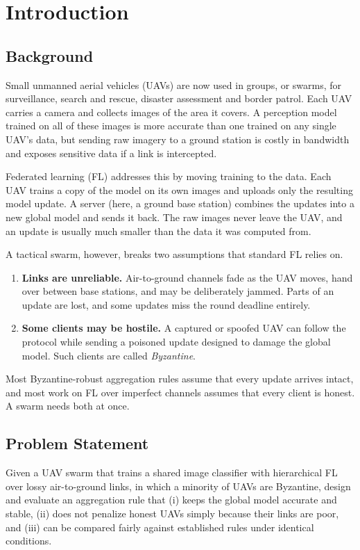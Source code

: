 \chapter{Introduction}
\thispagestyle{empty} %
\label{ch:intro}

\section{Background}
Small unmanned aerial vehicles (UAVs) are now used in groups, or swarms, for
surveillance, search and rescue, disaster assessment and border patrol. Each UAV
carries a camera and collects images of the area it covers. A perception model
trained on all of these images is more accurate than one trained on any single
UAV's data, but sending raw imagery to a ground station is costly in bandwidth and
exposes sensitive data if a link is intercepted.

Federated learning (FL) addresses this by moving training to the data. Each UAV
trains a copy of the model on its own images and uploads only the resulting model
update. A server (here, a ground base station) combines the updates into a new
global model and sends it back. The raw images never leave the UAV, and an update is
usually much smaller than the data it was computed from.

A tactical swarm, however, breaks two assumptions that standard FL relies on.
\begin{enumerate}
\item \textbf{Links are unreliable.} Air-to-ground channels fade as the UAV moves,
  hand over between base stations, and may be deliberately jammed. Parts of an update
  are lost, and some updates miss the round deadline entirely.
\item \textbf{Some clients may be hostile.} A captured or spoofed UAV can follow the
  protocol while sending a poisoned update designed to damage the global model. Such
  clients are called \emph{Byzantine}.
\end{enumerate}
Most Byzantine-robust aggregation rules assume that every update arrives intact, and
most work on FL over imperfect channels assumes that every client is honest. A swarm
needs both at once.

\section{Problem Statement}
Given a UAV swarm that trains a shared image classifier with hierarchical FL over
lossy air-to-ground links, in which a minority of UAVs are Byzantine, design and
evaluate an aggregation rule that (i) keeps the global model accurate and stable,
(ii) does not penalize honest UAVs simply because their links are poor, and
(iii) can be compared fairly against established rules under identical conditions.

